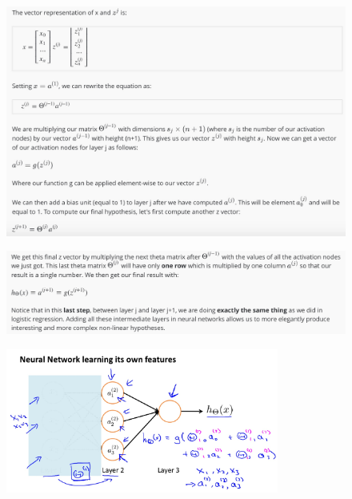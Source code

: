 \documentclass[12pt, A4,onecolumn]{article} %
\begin{document}
\begin{figure}[H]
	\centering
	\includegraphics[width=1\textwidth]{./ImagenesW4/modelRep7}
\end{figure}

\begin{figure}[H]
	\centering
	\includegraphics[width=1\textwidth]{./ImagenesW4/modelRep8}
\end{figure}

\begin{figure}[H]
	\centering
	\includegraphics[width=0.8\textwidth]{./ImagenesW4/forwardProp2}
\end{figure}
\end{document}
